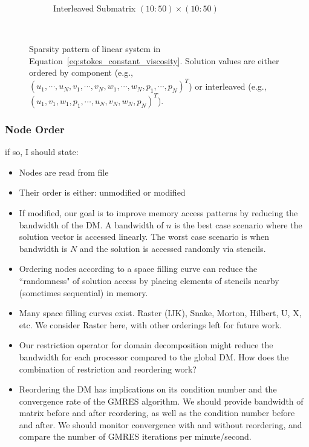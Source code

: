 \begin{figure}
\begin{subfigure}[b]{0.4\textwidth}
		\caption{Interleaved Submatrix $(10:50) \times (10:50)$}
		\label{fig:interleaved_stokes_zoom_dm}
	\end{subfigure} \\
\caption{Sparsity pattern of linear system in Equation~\ref{eq:stokes_constant_viscosity}. Solution values are either ordered by component (e.g., $( u_1, \cdots, u_N, v_1, \cdots, v_N, w_1, \cdots, w_N, p_1, \cdots, p_N)^T$) or interleaved (e.g., $( u_1, v_1, w_1, p_1,\cdots, u_N, v_N, w_N, p_N)^T$). }
\label{fig:interleaved_solution}
\end{figure} 


\subsubsection{Node Order} 
if so, I should state: 
\begin{itemize} 
\item Nodes are read from file
\item Their order is either: unmodified or modified
\item If modified, our goal is to improve memory access patterns by reducing the bandwidth of the DM. A bandwidth of $n$ is the best case scenario where the solution vector is accessed linearly. The worst case scenario is when bandwidth is $N$ and the solution is accessed randomly via stencils. 
\item Ordering nodes according to a space filling curve can reduce the ``randomness" of solution access by placing elements of stencils nearby (sometimes sequential) in memory. 
\item Many space filling curves exist. Raster (IJK), Snake, Morton, Hilbert, U, X, etc. We consider Raster here, with other orderings left for future work. 
\item Our restriction operator for domain decomposition might reduce the bandwidth for each processor compared to the global DM. How does the combination of restriction and reordering work? 
\item Reordering the DM has implications on its condition number and the convergence rate of the GMRES algorithm. We should provide bandwidth of matrix before and after reordering, as well as the condition number before and after. We should monitor convergence with and without reordering, and compare the number of GMRES iterations per minute/second. 
\end{itemize}  

